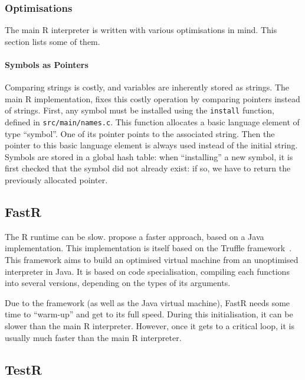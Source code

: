 \documentclass{article}
\newcommand\R{R}
\begin{document}
\subsubsection{Optimisations}
\label{sec:optimisations}

The main \R{} interpreter is written with various optimisations in mind.
This section lists some of them.

\paragraph{Symbols as Pointers}
%
Comparing strings is costly,
and variables are inherently stored as strings.
The main \R{} implementation,
fixes this costly operation by comparing pointers
instead of strings.
First, any symbol must be installed using the \texttt{install}
function, defined in \texttt{src/main/names.c}.
This function allocates a basic language element
of type “symbol”.
One of its pointer points to the associated string.
Then the pointer to this basic language element
is always used instead of the initial string.
%
Symbols are stored in a global hash table:
when “installing” a new symbol, it is first checked
that the symbol did not already exist:
if so, we have to return the previously allocated pointer.


\subsection{FastR}
\label{sec:FastR}

The \R{} runtime can be slow.
\cite{kalibera2014fast} propose a faster approach,
based on a Java implementation.
This implementation is itself based on the Truffle
framework~\parencite{wimmer2012truffle}.
This framework aims to build an optimised virtual machine
from an unoptimised interpreter in Java.
It is based on code specialisation,
compiling each functions into several versions,
depending on the types of its arguments.

Due to the framework (as well as the Java virtual machine),
FastR needs some time to “warm-up” and get to its full speed.
During this initialisation, it can be slower than the main
\R{} interpreter.
However, once it gets to a critical loop,
it is usually much faster than the main \R{} interpreter.

\subsection{TestR}
\label{sec:TestR}
\end{document}

